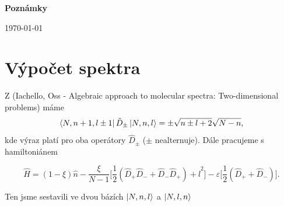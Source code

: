 \documentclass{article}
\begin{document}
\begin{center}
    \Large
    \textbf{Poznámky}
           
    \vspace{0.4cm}
    \small
    \today
\end{center}

\section{Výpočet spektra}

Z (Iachello, Oss - Algebraic approach to molecular spectra: Two-dimensional problems) máme
$$\bra{N,n+1,l\pm1} \hat{D}_{\pm} \ket{N,n,l} = \pm \sqrt{n \pm l +2 }\sqrt{N - n},$$
kde výraz platí pro oba operátory $\hat{D}_{\pm}$ ($\pm$ nealternuje). Dále pracujeme s hamiltoniánem

$$\hat{H} = (1-\xi)\hat{n} -\frac{\xi}{N-1}\bigg[ \frac{1}{2}\left(\hat{D}_{+} \hat{D}_{-}+\hat{D}_{-} \hat{D}_{+}\right)+\hat{l}^{2}\bigg]
-\varepsilon\bigg[\frac{1}{2}(\hat{D}_+ + \hat{D}_-)\bigg].$$

Ten jsme sestavili ve dvou bázích $\ket{N,n,l}$ a $\ket{N,l,n}$
\end{document}
